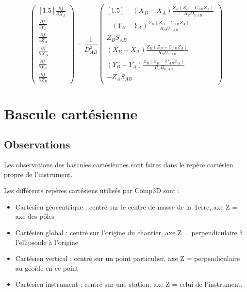 \documentclass[french]{report}
\begin{document}
$$\begin{pmatrix}[1.5]
\frac{\partial f}{\partial X_A}\\
\frac{\partial f}{\partial Y_A}\\
\frac{\partial f}{\partial Z_A}\\
\frac{\partial f}{\partial X_B}\\
\frac{\partial f}{\partial Y_B}\\
\frac{\partial f}{\partial Z_B} \end{pmatrix}
= \frac{1}{D_{AB}^2}
\begin{pmatrix}[1.5]
-(X_B-X_A) \frac{Z_B (Z_B - C_{AB} Z_A)}{R_S D_{0,AB}}\\
-(Y_B-Y_A) \frac{Z_B (Z_B - C_{AB} Z_A)} {R_S D_{0,AB}}\\
Z_B S_{AB}\\
(X_B-X_A) \frac{Z_B (Z_B - C_{AB} Z_A)}{R_S D_{0,AB}}\\
(Y_B-Y_A) \frac{Z_B (Z_B - C_{AB} Z_A)}{R_S D_{0,AB}}\\
-Z_A S_{AB}\\
\end{pmatrix}$$



\section{Bascule cartésienne}\label{bascule}

\subsection{Observations}

Les observations des bascules cartésiennes sont faites dans le repère cartésien propre de l'instrument.

Les différents repères cartésiens utilisés par Comp3D sont :
\begin{itemize}
\item Cartésien géocentrique : centré sur le centre de masse de la Terre, axe Z = axe des pôles
\item Cartésien global : centré sur l'origine du chantier, axe Z = perpendiculaire à l'ellipsoïde à l'origine
\item Cartésien vertical : centré sur un point particulier, axe Z = perpendiculaire au géoïde en ce point
\item Cartésien instrument : centré sur une station, axe Z = celui de l'instrument.
\end{itemize}
\end{document}
